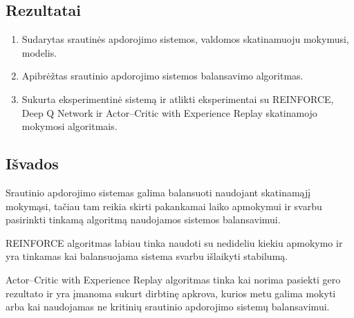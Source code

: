 \documentclass{VUMIFPSbakalaurinis}
\begin{document}
\subsection*{Rezultatai}
\begin{enumerate}
    \item Sudarytas srautinės apdorojimo sistemos, valdomos skatinamuoju mokymusi, modelis.
    \item Apibrėžtas srautinio apdorojimo sistemos balansavimo algoritmas.
    \item Sukurta eksperimentinė sistemą ir atlikti eksperimentai su REINFORCE, Deep Q Network ir Actor–Critic with Experience Replay skatinamojo mokymosi algoritmais.
\end{enumerate}

\subsection*{Išvados}
Srautinio apdorojimo sistemas galima balansuoti naudojant skatinamąjį mokymąsi, tačiau tam reikia skirti pakankamai laiko apmokymui ir svarbu pasirinkti tinkamą algoritmą naudojamos sistemos balansavimui.

REINFORCE algoritmas labiau tinka naudoti su nedideliu kiekiu apmokymo ir yra tinkamas kai balansuojama sistema svarbu išlaikyti stabilumą.

Actor–Critic with Experience Replay algoritmas tinka kai norima pasiekti gero rezultato ir yra įmanoma sukurt dirbtinę apkrova, kurios metu galima mokyti arba kai naudojamas ne kritinių srautinio apdorojimo sistemų balansavimui.

\printbibliography[heading=bibintoc] 
\end{document}

